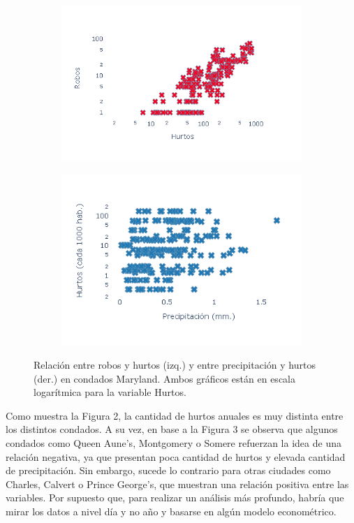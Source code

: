 \documentclass[10.5pt]{article}   %
\begin{document}
\begin{figure}[H]
\centering
\begin{subfigure}{.5\textwidth}
    \centering
     \textbf{}\par\medskip
    \includegraphics[scale=0.8]{robos.png}
    \label{fig2}
\end{subfigure}%
\begin{subfigure}{0.5\textwidth}
    \centering
     \textbf{}\par\medskip
    \includegraphics[scale=0.8]{plot_prec.png}
    \label{fig2}
\end{subfigure}%
\caption{Relación entre robos y hurtos (izq.) y entre precipitación y hurtos (der.) en condados Maryland. Ambos gráficos están en escala logarítmica para la variable Hurtos.}
\end{figure}

Como muestra la Figura 2, la cantidad de hurtos anuales es muy distinta entre los distintos condados. A su vez, en base a la Figura 3 se observa que algunos condados como Queen Aune's, Montgomery o Somere refuerzan la idea de una relación negativa, ya que presentan poca cantidad de hurtos y elevada cantidad de precipitación. Sin embargo, sucede lo contrario para otras ciudades como Charles, Calvert o Prince George's, que muestran una relación positiva entre las variables. Por supuesto que, para realizar un análisis más profundo, habría que mirar los datos a nivel día y no año y basarse en algún modelo econométrico.
\end{document}
